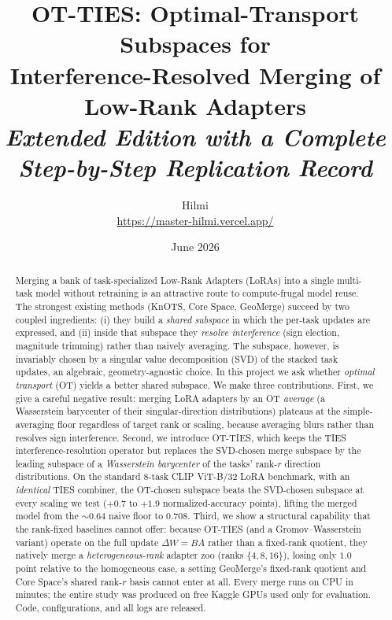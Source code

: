 \documentclass[11pt]{article}
\title{\textbf{OT-TIES: Optimal-Transport Subspaces for\\
Interference-Resolved Merging of Low-Rank Adapters}\\[4pt]
\large\emph{Extended Edition with a Complete Step-by-Step Replication Record}}
\author{
Hilmi\\
\url{https://master-hilmi.vercel.app/}
}
\date{June 2026}
\newcommand{\dW}{\Delta W}
\newcommand{\otties}{\textsc{OT-TIES}}
\begin{document}
\maketitle

\begin{abstract}
Merging a bank of task-specialized Low-Rank Adapters (LoRAs) into a single multi-task model without
retraining is an attractive route to compute-frugal model reuse. The strongest existing methods
(KnOTS, Core Space, GeoMerge) succeed by two coupled ingredients: (i) they build a \emph{shared
subspace} in which the per-task updates are expressed, and (ii) inside that subspace they
\emph{resolve interference} (sign election, magnitude trimming) rather than naively averaging.
The subspace, however, is invariably chosen by a singular value decomposition (SVD) of the stacked
task updates, an algebraic, geometry-agnostic choice. In this project we ask whether
\emph{optimal transport} (OT) yields a better shared subspace. We make three contributions.
First, we give a careful negative result: merging LoRA adapters by an OT \emph{average}
(a Wasserstein barycenter of their singular-direction distributions) plateaus at the
simple-averaging floor regardless of target rank or scaling, because averaging blurs rather than
resolves sign interference. Second, we introduce \otties{}, which keeps the TIES interference-resolution
operator but replaces the SVD-chosen merge subspace by the leading subspace of a \emph{Wasserstein
barycenter} of the tasks' rank-$r$ direction distributions. On the standard $8$-task CLIP ViT-B/32
LoRA benchmark, with an \emph{identical} TIES combiner, the OT-chosen subspace beats the SVD-chosen
subspace at every scaling we test ($+0.7$ to $+1.9$ normalized-accuracy points), lifting the merged
model from the $\sim\!0.64$ naive floor to $0.708$. Third, we show a structural capability that the
rank-fixed baselines cannot offer: because \otties{} (and a Gromov--Wasserstein variant) operate on
the full update $\dW=BA$ rather than a fixed-rank quotient, they natively merge a
\emph{heterogeneous-rank} adapter zoo (ranks $\{4,8,16\}$), losing only $1.0$ point relative to the
homogeneous case, a setting GeoMerge's fixed-rank quotient and Core Space's shared rank-$r$ basis
cannot enter at all. Every merge runs on CPU in minutes; the entire study was produced on free
Kaggle GPUs used only for evaluation. Code, configurations, and all logs are released.
\end{abstract}

\tableofcontents
\newpage
\end{document}

